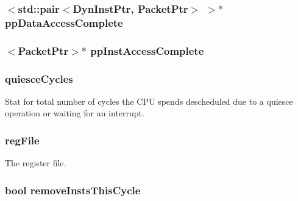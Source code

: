 \label{classFullO3CPU_a457c81c9e364d41871df8cb5f04ea1b4}
\hypertarget{classFullO3CPU_a4cbcb5b1a3968d3e5229656571604ba5}{
\subsubsection[{ppDataAccessComplete}]{$<${\bf std::pair}$<${\bf DynInstPtr}, {\bf PacketPtr}$>$ $>$$\ast$ {\bf ppDataAccessComplete}}}
\label{classFullO3CPU_a4cbcb5b1a3968d3e5229656571604ba5}
\hypertarget{classFullO3CPU_aa39ae53643b00bc644caa5967b8a428a}{
\subsubsection[{ppInstAccessComplete}]{$<${\bf PacketPtr}$>$$\ast$ {\bf ppInstAccessComplete}}}
\label{classFullO3CPU_aa39ae53643b00bc644caa5967b8a428a}
\hypertarget{classFullO3CPU_abb746a633705067014bd46e175928a51}{
\subsubsection[{quiesceCycles}]{ {\bf quiesceCycles}}}
\label{classFullO3CPU_abb746a633705067014bd46e175928a51}
Stat for total number of cycles the CPU spends descheduled due to a quiesce operation or waiting for an interrupt. \hypertarget{classFullO3CPU_aa760a1e4a392e8e5c1dd8ed85b9f56fe}{
\subsubsection[{regFile}]{ {\bf regFile}}}
\label{classFullO3CPU_aa760a1e4a392e8e5c1dd8ed85b9f56fe}
The register file. \hypertarget{classFullO3CPU_a2825a91132fe292d64dca3c61fd07410}{
\subsubsection[{removeInstsThisCycle}]{\setlength{\rightskip}{0pt plus 5cm}bool {\bf removeInstsThisCycle}}}
